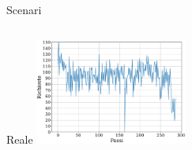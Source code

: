\documentclass[]{beamer}
\begin{document}
\begin{frame}{Scenari}
    \begin{columns}
        \begin{column}{.5\textwidth}           
            \centering
            Reale
            \includegraphics[width=5cm]{assets/5/requests_real_64425_single_agent.pdf}
        \end{column}
    \end{columns}

    \vspace{.4cm}


\end{frame}
\end{document}
